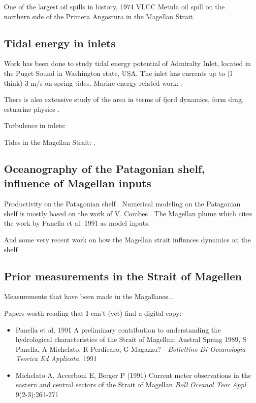 \documentclass[11pt, oneside]{article}   	%
\begin{document}
One of the largest oil spills in history, 1974 VLCC Metula oil spill on the northern side of the Primera Angostura in the Magellan Strait. \citep{gundlach82}
{}
\citep{iriarte18}

\subsection*{Tidal energy in inlets}

Work has been done to study tidal energy potential of Admiralty Inlet, located in the Puget Sound in Washington state, USA. The inlet has currents up to (I think) 3 m/s on spring tides. Marine energy related work: \citep{polagye13, kawasethyng10, thomson12, polagye09}. 

There is also extensive study of the area in terms of fjord dynamics, form drag, estuarine physics \citep[e.g.][]{warner13, geyer82}.

Turbulence in inlets: \citep{guerra17}

Tides in the Magellan Strait: \citep{conteras04, medeiros88}.

\subsection*{Oceanography of the Patagonian shelf, influence of Magellan inputs}
Productivity on the Patagonian shelf \citep{song16}. Numerical modeling on the Patagonian shelf is mostly based on the work of V. Combes \citep{combes14}. The Magellan plume \citep{palma12} which cites the work by Panella et al. 1991 as model inputs.

And some very recent work on how the Magellan strait influnces dynamics on the shelf \citep{guihou20, brun20}


\subsection*{Prior measurements in the Strait of Magellen}
Measurements that have been made in the Magallanes... \citep{antezana99}

Papers worth reading that I can't (yet) find a digital copy: 

\begin{itemize}
\item Panella et al. 1991 A preliminary contribution to understanding the hydrological characteristics of the Strait of Magellan: Austral Spring 1989, S Panella, A Michelato, R Perdicaro, G Magazzu? - \textit{Bollettino Di Oceanologia Teorica Ed Applicata}, 1991

\item Michelato A, Accerboni E, Berger P (1991) Current meter observations in the eastern and central sectors of the Strait of Magellan \textit{Boll Oceanol Teor Appl} 9(2-3):261-271
\end{itemize}
\end{document}

